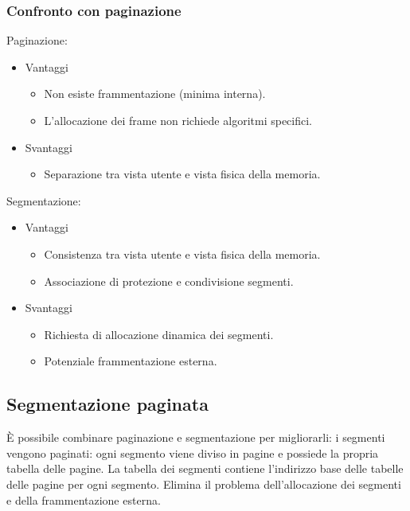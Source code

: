 \subsubsection{Confronto con paginazione}
\begin{multicols}{2}
	Paginazione:
	\begin{itemize}
		\item Vantaggi
			\begin{itemize}
				\item Non esiste frammentazione (minima interna).
				\item L'allocazione dei frame non richiede algoritmi specifici.
			\end{itemize}
		\item Svantaggi
			\begin{itemize}
				\item Separazione tra vista utente e vista fisica della memoria.
			\end{itemize}
	\end{itemize}
	\columnbreak
	Segmentazione:
	\begin{itemize}
		\item Vantaggi
			\begin{itemize}
				\item Consistenza tra vista utente e vista fisica della memoria.
				\item Associazione di protezione e condivisione segmenti.
			\end{itemize}
		\item Svantaggi
			\begin{itemize}
				\item Richiesta di allocazione dinamica dei segmenti.
				\item Potenziale frammentazione esterna.
			\end{itemize}
	\end{itemize}
\end{multicols}
\subsection{Segmentazione paginata}
\`E possibile combinare paginazione e segmentazione per migliorarli: i segmenti vengono paginati: ogni segmento viene diviso in pagine e possiede la propria tabella delle pagine. La
tabella dei segmenti contiene l'indirizzo base delle tabelle delle pagine per ogni segmento. Elimina il problema dell'allocazione dei segmenti e della frammentazione esterna. 
